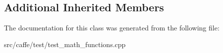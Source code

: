 \subsection*{Additional Inherited Members}


The documentation for this class was generated from the following file\+:\begin{DoxyCompactItemize}
\item 
src/caffe/test/test\+\_\+math\+\_\+functions.\+cpp\end{DoxyCompactItemize}
